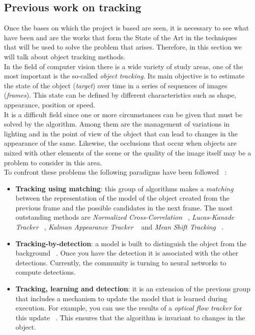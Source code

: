 \documentclass{bmvc2k}
\begin{document}
\subsection{Previous work on tracking}
Once the bases on which the project is based are seen, it is necessary to see what have been and are the works that form the State of the Art in the techniques that will be used to solve the problem that arises. Therefore, in this section we will talk about object tracking methods.\\ %
In the field of computer vision there is a wide variety of study areas, one of the most important is the so-called \textit{object tracking}. Its main objective is to estimate the state of the object (\textit{target}) over time in a series of sequences of images (\textit{frames}). This state can be defined by different characteristics such as shape, appearance, position or speed.\\
It is a difficult field since one or more circumstances can be given that must be solved by the algorithm. Among them are the management of variations in lighting and in the point of view of the object that can lead to changes in the appearance of the same. Likewise, the occlusions that occur when objects are mixed with other elements of the scene or the quality of the image itself may be a problem to consider in this area.\\
To confront these problems the following paradigms have been followed ~\cite{smeulders2014visual}:
\begin{itemize}
\item \textbf{Tracking using matching}: this group of algorithms makes a \textit {matching} between the representation of the model of the object created from the previous frame and the possible candidates in the next frame. The most outstanding methods are \textit{Normalized Cross-Correlation} ~\cite{briechle2001template}, \textit{Lucas-Kanade Tracker} ~\cite {baker2004lucas}, \textit{Kalman Appearance Tracker} ~\cite{nguyen2004fast} and \textit{Mean Shift Tracking} ~\cite{comaniciu2000real}.
\item \textbf{Tracking-by-detection}: a model is built to distinguish the object from the background ~\cite{nguyen2006robust}. Once you have the detection it is associated with the other detections. Currently, the community is turning to neural networks to compute detections.
\item \textbf{Tracking, learning and detection}: it is an extension of the previous group that includes a mechanism to update the model that is learned during execution. For example, you can use the results of a \textit{optical flow tracker} for this update ~\cite{kalal2010pn}. This ensures that the algorithm is invariant to changes in the object. 
\end{itemize}
\end{document}
